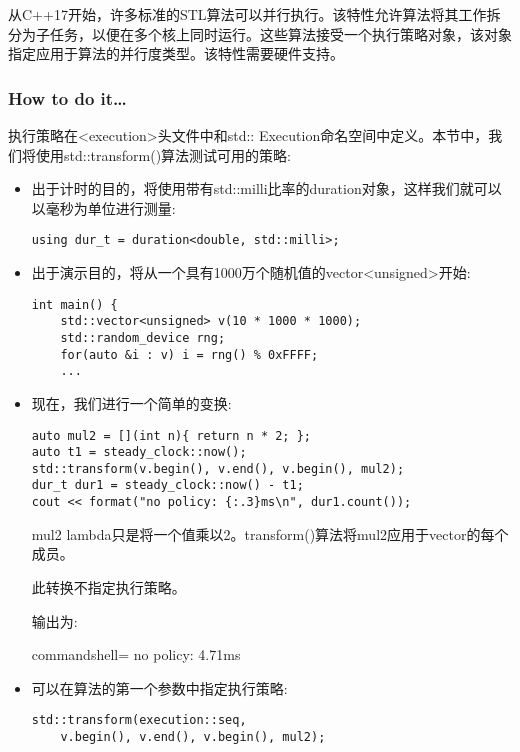 
从C++17开始，许多标准的STL算法可以并行执行。该特性允许算法将其工作拆分为子任务，以便在多个核上同时运行。这些算法接受一个执行策略对象，该对象指定应用于算法的并行度类型。该特性需要硬件支持。

\subsubsection{How to do it…}

执行策略在<execution>头文件中和std:: Execution命名空间中定义。本节中，我们将使用std::transform()算法测试可用的策略:

\begin{itemize}
\item 
出于计时的目的，将使用带有std::milli比率的duration对象，这样我们就可以以毫秒为单位进行测量:

\begin{lstlisting}[style=styleCXX]
using dur_t = duration<double, std::milli>;
\end{lstlisting}

\item 
出于演示目的，将从一个具有1000万个随机值的vector<unsigned>开始:

\begin{lstlisting}[style=styleCXX]
int main() {
	std::vector<unsigned> v(10 * 1000 * 1000);
	std::random_device rng;
	for(auto &i : v) i = rng() % 0xFFFF;
	...
\end{lstlisting}

\item 
现在，我们进行一个简单的变换:

\begin{lstlisting}[style=styleCXX]
auto mul2 = [](int n){ return n * 2; };
auto t1 = steady_clock::now();
std::transform(v.begin(), v.end(), v.begin(), mul2);
dur_t dur1 = steady_clock::now() - t1;
cout << format("no policy: {:.3}ms\n", dur1.count());
\end{lstlisting}

mul2 lambda只是将一个值乘以2。transform()算法将mul2应用于vector的每个成员。

此转换不指定执行策略。

输出为:

\begin{tcblisting}{commandshell={}}
no policy: 4.71ms
\end{tcblisting}

\item 
可以在算法的第一个参数中指定执行策略:

\begin{lstlisting}[style=styleCXX]
std::transform(execution::seq,
	v.begin(), v.end(), v.begin(), mul2);
\end{lstlisting}


\end{itemize}
